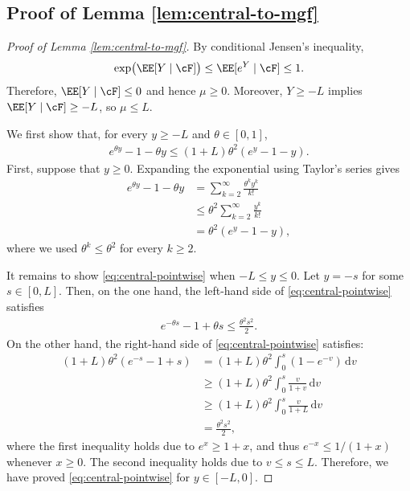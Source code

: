 \documentclass[11pt]{article}
\begin{document}
\subsection{Proof of Lemma \ref{lem:central-to-mgf}}
 \begin{proof}[Proof of Lemma \ref{lem:central-to-mgf}]
By conditional Jensen's inequality,
\begin{align*}
    \exp\bigl(\EE[Y\mid\cF]\bigr)
    \leq
    \EE[e^Y\mid\cF]
    \leq1.
\end{align*}
Therefore, $\EE[Y\mid\cF]\leq0$ and hence $\mu\geq0$. Moreover,
$Y\geq-L$ implies $\EE[Y\mid\cF]\geq-L$, so $\mu\leq L$.

We first show that, for every $y\geq-L$ and $\theta\in[0,1]$,
\begin{align}
    e^{\theta y}-1-\theta y
    \leq
    (1+L)\theta^2(e^y-1-y).
    \label{eq:central-pointwise}
\end{align}
First, suppose that $y\geq0$. Expanding the exponential using Taylor's series gives
\begin{align*}
    e^{\theta y}-1-\theta y
    &=
    \sum_{k=2}^{\infty}
    \frac{\theta^ky^k}{k!}\\
    &\leq
    \theta^2
    \sum_{k=2}^{\infty}
    \frac{y^k}{k!}\\
    &=
    \theta^2(e^y-1-y),
\end{align*}
where we used $\theta^k\leq\theta^2$ for every $k\geq2$.

It remains to show \eqref{eq:central-pointwise} when $-L \le y \le 0$. Let $y=-s$ for some $s\in[0,L]$. Then, on the one hand, the left-hand side of \eqref{eq:central-pointwise} satisfies
\begin{align*}
    e^{-\theta s}-1+\theta s
    \leq
    \frac{\theta^2s^2}{2}.
\end{align*}
On the other hand, the right-hand side of \eqref{eq:central-pointwise} satisfies:
\begin{align*}
    (1+L)\theta^2(e^{-s}-1+s)
    &=
    (1+L)\theta^2\int_0^s(1-e^{-v})\,\mathrm dv\\
    &\geq(1+L)\theta^2
    \int_0^s\frac{v}{1+v}\,\mathrm dv\\
    &\geq(1+L)\theta^2
    \int_0^s\frac{v}{1+L}\,\mathrm dv\\
    &=
    \frac{\theta^2s^2}{2},
\end{align*}
where the first inequality holds due to $e^x \ge 1+x$, and thus $e^{-x} \le 1/(1+x)$ whenever $x \ge 0$. The second inequality holds due to $v \le s \le L$.
Therefore, we have proved \eqref{eq:central-pointwise} for $y\in[-L,0]$.


\end{proof}
\end{document}
